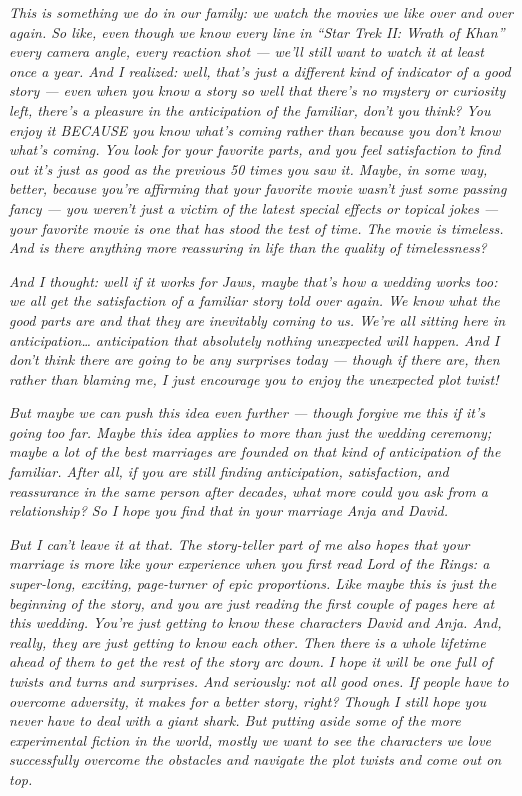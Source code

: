 \emph{This is something we do in our family: we watch the movies we like
over and over again. So like, even though we know every line in ``Star
Trek II: Wrath of Khan'' every camera angle, every reaction shot ---
we'll still want to watch it at least once a year. And I realized: well,
that's just a different kind of indicator of a good story --- even when
you know a story so well that there's no mystery or curiosity left,
there's a pleasure in the anticipation of the familiar, don't you think?
You enjoy it BECAUSE you know what's coming rather than because you
don't know what's coming. You look for your favorite parts, and you feel
satisfaction to find out it's just as good as the previous 50 times you
saw it. Maybe, in some way, better, because you're affirming that your
favorite movie wasn't just some passing fancy --- you weren't just a
victim of the latest special effects or topical jokes --- your favorite
movie is one that has stood the test of time. The movie is timeless. And
is there anything more reassuring in life than the quality of
timelessness?}

\emph{And I thought: well if it works for Jaws, maybe that's how a
wedding works too: we all get the satisfaction of a familiar story told
over again. We know what the good parts are and that they are inevitably
coming to us. We're all sitting here in anticipation\ldots{}
anticipation that absolutely nothing unexpected will happen. And I don't
think there are going to be any surprises today --- though if there are,
then rather than blaming me, I just encourage you to enjoy the
unexpected plot twist!}

\emph{But maybe we can push this idea even further --- though forgive me
this if it's going too far. Maybe this idea applies to more than just
the wedding ceremony; maybe a lot of the best marriages are founded on
that kind of anticipation of the familiar. After all, if you are still
finding anticipation, satisfaction, and reassurance in the same person
after decades, what more could you ask from a relationship? So I hope
you find that in your marriage Anja and David.}

\emph{But I can't leave it at that. The story-teller part of me also hopes
that your marriage is more like your experience when you first read Lord
of the Rings: a super-long, exciting, page-turner of epic proportions.
Like maybe this is just the beginning of the story, and you are just
reading the first couple of pages here at this wedding. You're just
getting to know these characters David and Anja. And, really, they are
just getting to know each other. Then there is a whole lifetime ahead of
them to get the rest of the story arc down. I hope it will be one full
of twists and turns and surprises. And seriously: not all good ones. If
people have to overcome adversity, it makes for a better story, right?
Though I still hope you never have to deal with a giant shark. But
putting aside some of the more experimental fiction in the world, mostly
we want to see the characters we love successfully overcome the
obstacles and navigate the plot twists and come out on top.}

